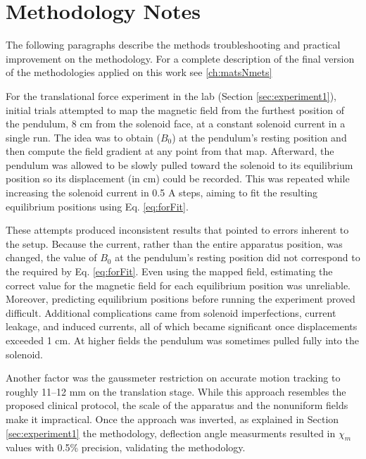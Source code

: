\section{Methodology Notes}
\label{app:MethodologyNotes}

The following paragraphs describe the methods troubleshooting and practical improvement on the methodology. For a complete description of the final version of the methodologies applied on this work see \ref{ch:matsNmets}

For the translational force experiment in the lab (Section \ref{sec:experiment1}), initial trials attempted to map the magnetic field from the furthest position of the pendulum, 8 cm from the solenoid face, at a constant solenoid current in a single run. The idea was to obtain ($B_0$) at the pendulum’s resting position and then compute the field gradient at any point from that map. Afterward, the pendulum was allowed to be slowly pulled toward the solenoid to its equilibrium position so its displacement (in cm) could be recorded. This was repeated while increasing the solenoid current in 0.5 A steps, aiming to fit the resulting equilibrium positions using Eq. \ref{eq:forFit}. 

These attempts produced inconsistent results that pointed to errors inherent to the setup. Because the current, rather than the entire apparatus position, was changed, the value of $B_0$ at the pendulum’s resting position did not correspond to the required by Eq. \ref{eq:forFit}. Even using the mapped field, estimating the correct value for the magnetic field for each equilibrium position was unreliable. Moreover, predicting equilibrium positions before running the experiment proved difficult. Additional complications came from solenoid imperfections, current leakage, and induced currents, all of which became significant once displacements exceeded 1 cm. At higher fields the pendulum was sometimes pulled fully into the solenoid. 

Another factor was the gaussmeter restriction on accurate motion tracking to roughly 11–12 mm on the translation stage. While this approach resembles the proposed clinical protocol, the scale of the apparatus and the nonuniform fields make it impractical. Once the approach was inverted, as explained in Section \ref{sec:experiment1} the methodology, deflection angle measurments resulted in $\chi_m$ values with 0.5\% precision, validating the methodology.

